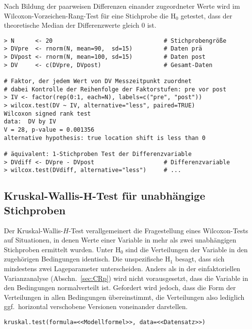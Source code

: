 Nach Bildung der paarweisen Differenzen einander zugeordneter Werte wird im Wilcoxon-Vorzeichen-Rang-Test für eine Stichprobe die $\text{H}_{0}$ getestet, dass der theoretische Median der Differenzwerte gleich $0$ ist.
\begin{lstlisting}
> N      <- 20                                # Stichprobengröße
> DVpre  <- rnorm(N, mean=90,  sd=15)         # Daten prä
> DVpost <- rnorm(N, mean=100, sd=15)         # Daten post
> DV     <- c(DVpre, DVpost)                  # Gesamt-Daten

# Faktor, der jedem Wert von DV Messzeitpunkt zuordnet
# dabei Kontrolle der Reihenfolge der Faktorstufen: pre vor post
> IV <- factor(rep(0:1, each=N), labels=c("pre", "post"))
> wilcox.test(DV ~ IV, alternative="less", paired=TRUE)
Wilcoxon signed rank test
data:  DV by IV
V = 28, p-value = 0.001356
alternative hypothesis: true location shift is less than 0

# äquivalent: 1-Stichproben Test der Differenzvariable
> DVdiff <- DVpre - DVpost                    # Differenzvariable
> wilcox.test(DVdiff, alternative="less")     # ...
\end{lstlisting}

\subsection[Kruskal-Wallis-\texorpdfstring{$H$}{H}-Test für unabhängige Stichproben]{Kruskal-Wallis-$\bm{H}$-Test für unabhängige Stichproben}
\label{sec:kruskal}

Der Kruskal-Wallis-$H$-Test verallgemeinert die Fragestellung eines Wilcoxon-Tests auf Situationen, in denen Werte einer Variable in mehr als zwei unabhängigen Stichproben ermittelt wurden. Unter $\text{H}_{0}$ sind die Verteilungen der Variable in den zugehörigen Bedingungen identisch. Die unspezifische $\text{H}_{1}$ besagt, dass sich mindestens zwei Lageparameter unterscheiden. Anders als in der einfaktoriellen Varianzanalyse (Abschn.\ \ref{sec:CRp}) wird nicht vorausgesetzt, dass die Variable in den Bedingungen normalverteilt ist. Gefordert wird jedoch, dass die Form der Verteilungen in allen Bedingungen übereinstimmt, die Verteilungen also lediglich ggf.\ horizontal verschobene Versionen voneinander darstellen.
\begin{lstlisting}
kruskal.test(formula=<<Modellformel>>, data=<<Datensatz>>)
\end{lstlisting}

